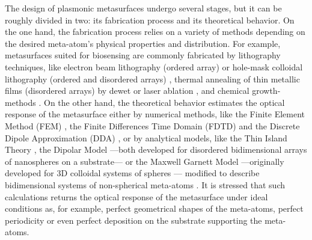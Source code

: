 The design of plasmonic metasurfaces undergo several stages, but it can be roughly divided in two: its fabrication process and its theoretical behavior. On the one hand, the fabrication process relies on a variety of methods depending on the desired meta-atom's physical properties and distribution. For example, metasurfaces suited for biosensing are commonly  fabricated by lithography techniques, like electron beam lithography (ordered array) or hole-mask colloidal lithography  (ordered and disordered arrays) \cite{estevez_trends_2014}, thermal annealing of thin metallic films (disordered arrays) by dewet \cite{qiu_dual_2020} or laser ablation \cite{meng_anisotropic_2015}, and chemical growth-methods \cite{estevez_trends_2014,kabashin_plasmonic_2009}. On the other hand, the theoretical behavior estimates the optical response of the metasurface either by numerical methods, like the Finite Element Method (FEM) \cite{feuz_improving_2010}, the Finite Differences Time Domain (FDTD) \cite{qiu_differential_2015} and the Discrete Dipole Approximation (DDA) \cite{meng_anisotropic_2015}, or by analytical models, like the Thin Island Theory \cite{svedendahl_refractometric_2014,bedeaux_optical_2004}, the Dipolar Model \cite{barrera1991optical} ---both developed for disordered bidimensional arrays of nanospheres on a substrate--- or the Maxwell Garnett Model ---originally developed for 3D colloidal systems of spheres \cite{sihvola_electromagnetic_2008}--- modified to describe bidimensional systems of non-spherical meta-atoms \cite{oates_characterization_2011,kabashin_plasmonic_2009,moirangthem_enhanced_2012}. It is stressed that such calculations returns the optical response of the metasurface under ideal conditions as, for example, perfect geometrical shapes of the meta-atoms, perfect periodicity or even perfect deposition on the substrate supporting the meta-atoms.

